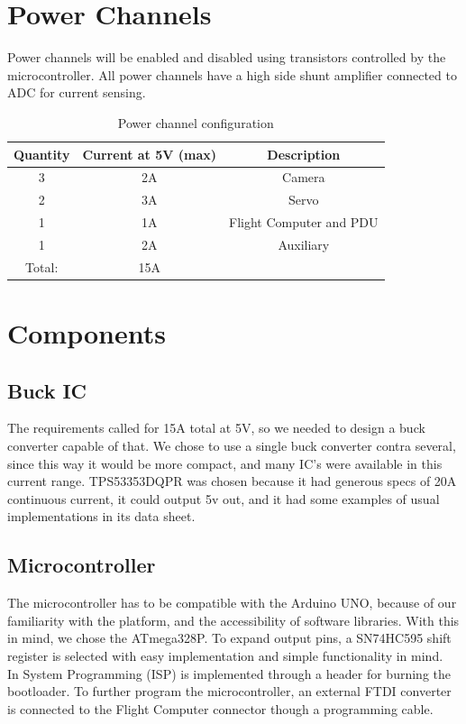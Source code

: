 \documentclass{article}
\begin{document}
\section{Power Channels}
Power channels will be enabled and disabled using transistors controlled by the microcontroller. All power channels have a high side shunt amplifier connected to ADC for current sensing.
\begin{table}
    \centering
    \begin{tabular}{|c|c|c|} \hline 
         \textbf{Quantity} &  \textbf{Current at 5V (max)}& \textbf{Description} \\ \hline 
 3& 2A&Camera\\ \hline 
 2& 3A&Servo\\ \hline 
 1& 1A&Flight Computer and PDU\\ \hline 
 1& 2A&Auxiliary\\ \hline 
 Total:& 15A&\\ \hline
    \end{tabular}
    \caption{Power channel configuration}
    \label{tab:pdu_pwr_config}
\end{table}

\section{Components}
\subsection{Buck IC}
The requirements called for 15A total at 5V, so we needed to design a buck converter capable of that. We chose to use a single buck converter contra several, since this way it would be more compact, and many IC's were available in this current range. TPS53353DQPR was chosen because it had generous specs of 20A continuous current, it could output 5v out, and it had some examples of usual implementations in its data sheet. 

\subsection{Microcontroller}
The microcontroller has to be compatible with the Arduino UNO, because of our familiarity with the platform, and the accessibility of software libraries. With this in mind, we chose the ATmega328P. To expand output pins, a SN74HC595 shift register is selected with easy implementation and simple functionality in mind. 
\\
In System Programming (ISP) is implemented through a header for burning the bootloader. To further program the microcontroller, an external FTDI converter is connected to the Flight Computer connector though a programming cable.
\end{document}
